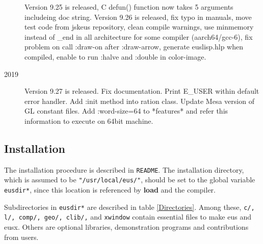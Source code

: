\begin{description}
            Version 9.25 is released, C defun() function now takes 5 arguments includeing doc string.
            Version 9.26 is released, fix typo in manuals, move test code from jskeus repository, clean compile warnings, use minmemory instead of \_end in all architecture for some compiler (aarch64/gcc-6), fix problem on call :draw-on after :draw-arrow, generate euslisp.hlp when compiled, enable to run :halve and :double in color-image.
\item[2019] Version 9.27 is released. Fix documentation. Print E\_USER within default error handler. Add :init method into ration class. Update Mesa version of GL constant files. Add :word-size=64 to *features* and refer this information to execute on 64bit machine.
\end{description}

\subsection{Installation}
The installation procedure is described in {\tt README}.
The installation directory, which is assumed to be {\tt "/usr/local/eus/"},
should be set to the global variable 
{\tt *eusdir*}, since this location is referenced
by {\bf load} and the compiler.

Subdirectories in  {\tt *eusdir*} are described in table \ref{Directories}.
Among these, 
{\tt c/, l/, comp/, geo/, clib/,} and {\tt xwindow} contain essential
files to make eus and eusx. Others are optional libraries, demonstration
programs and contributions from users.

